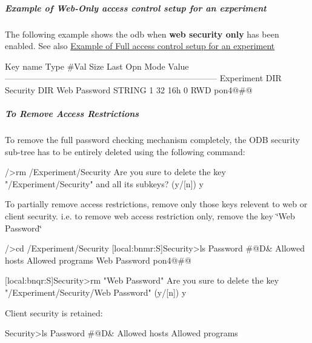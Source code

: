 \par


\par
\hypertarget{RC_customize_ODB_RC_Example_web_security}{}\subparagraph{Example of Web-\/Only access control setup for an experiment}\label{RC_customize_ODB_RC_Example_web_security}
The following example shows the odb when {\bfseries web security only} has been enabled. See also \hyperlink{RC_customize_ODB_RC_Example_full_security}{Example of Full access control setup for an experiment} 
\begin{DoxyCode}
Key name                        Type    #Val  Size  Last Opn Mode Value
---------------------------------------------------------------------------
Experiment                      DIR
    Security                    DIR
        Web Password            STRING  1     32    16h  0   RWD  pon4@#@%
\end{DoxyCode}




 \label{RC_customize_ODB_idx_ODB_tree_Experiment_Security_Remove-Access-restrictions}
\hypertarget{RC_customize_ODB_idx_ODB_tree_Experiment_Security_Remove-Access-restrictions}{}
 \hypertarget{RC_customize_ODB_RC_Remove_Security}{}\subparagraph{To Remove Access Restrictions}\label{RC_customize_ODB_RC_Remove_Security}
\label{RC_customize_ODB_idx_access-control_remove}
\hypertarget{RC_customize_ODB_idx_access-control_remove}{}
 To remove the full password checking mechanism completely, the ODB security sub-\/tree has to be entirely deleted using the following command: 
\begin{DoxyCode}
  [local]/>rm /Experiment/Security
  Are you sure to delete the key
  "/Experiment/Security"
  and all its subkeys? (y/[n]) y
\end{DoxyCode}


To partially remove access restrictions, remove only those keys relevent to web or client security. i.e. to remove web access restriction only, remove the key \char`\"{}Web Password\char`\"{}


\begin{DoxyCode}
  [local]/>cd /Experiment/Security
[local:bnmr:S]Security>ls
Password                        #@D&%
Allowed hosts
Allowed programs
Web Password                    pon4@#@%

[local:bnqr:S]Security>rm "Web Password"
Are you sure to delete the key
"/Experiment/Security/Web Password"
(y/[n]) y
\end{DoxyCode}


Client security is retained: 
\begin{DoxyCode}
Security>ls
Password                      #@D&%
Allowed hosts
Allowed programs
\end{DoxyCode}



